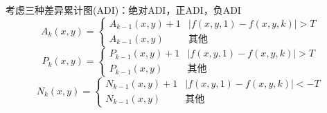 考虑三种差异累计图(ADI)：绝对ADI，正ADI，负ADI
\[A_{k}(x, y)=\begin{cases}
{A_{k-1}(x, y)+1} & {|f(x, y, 1)-f(x, y, k)|>T} \\
{A_{k-1}(x, y)} & \text{其他}
\end{cases}\]
\[P_{k}(x, y)=\begin{cases}
{P_{k-1}(x, y)+1} & {|f(x, y, 1)-f(x, y, k)|>T} \\
{P_{k-1}(x, y)} & \text{其他}
\end{cases}\]
\[N_{k}(x, y)=\begin{cases}
{N_{k-1}(x, y)+1} & {|f(x, y, 1)-f(x, y, k)|<-T} \\
{N_{k-1}(x, y)} & \text{其他}
\end{cases}\]